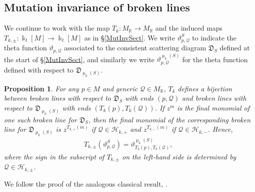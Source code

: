 \documentclass{amsart}
\let\bb=\mathbb
\let\rar=\rightarrow
\let\f=\mathfrak
\let\s=\mathcal
\newcommand {\kk} {\Bbbk}
\newcommand {\sQ} {\mathcal{Q}}
\renewcommand{\mu}{\upmu}
\theoremstyle{plain}%
\newtheorem{prop}[thm]{Proposition}
\theoremstyle{definition}
\theoremstyle{remark}
\begin{document}
\subsection{Mutation invariance of broken lines}\label{MutInvBL}

We continue to work with the map $T_k\colon M_{\bb{R}}\rar M_{\bb{R}}$ and the induced maps $T_{k,\pm}\colon \kk_t[M]\rar \kk_t[M]$ as in \S \ref{MutInvSect}.  We write $\vartheta_{p,\sQ}^S$ to indicate the theta function $\vartheta_{p,\sQ}$ associated to the consistent scattering diagram $\f{D}_S$ defined at the start of \S \ref{MutInvSect}, and similarly we write $\vartheta_{p,\sQ}^{\mu_k(S)}$ for the theta function defined with respect to $\f{D}_{\mu_k(S)}$.


 
\begin{prop}\label{MutInvBrokenLines}
For any $p\in M$ and generic $\sQ\in M_{\bb{R}}$, $T_k$ defines a bijection between broken lines with respect to $\f{D}_S$ with ends $(p,\sQ)$ and broken lines with respect to $\f{D}_{\mu_k(S)}$ with ends $(T_k(p),T_k(\sQ))$.  If $z^m$ is the final monomial of one such broken line for $\f{D}_S$, then the final monomial of the corresponding broken line for $\f{D}_{\mu_k(S)}$ is $z^{T_{k,+}(m)}$ if $\sQ\in \s{H}_{k,+}$ and $z^{T_{k,-}(m)}$ if $\sQ\in \s{H}_{k,-}$.  Hence,
\begin{align}\label{TkTheta}
    T_{k,\pm}(\vartheta_{p,\sQ}^S)=\vartheta_{T_k(p),T_{k}(\sQ)}^{\mu_k(S)},
\end{align} where the sign in the subscript of $T_{k,\pm}$ on the left-hand side is determined by $\sQ\in \s{H}_{k,\pm}$.
\end{prop}
We follow the proof of the analogous classical result, \cite[Prop. 3.6]{GHKK}.
\end{document}
